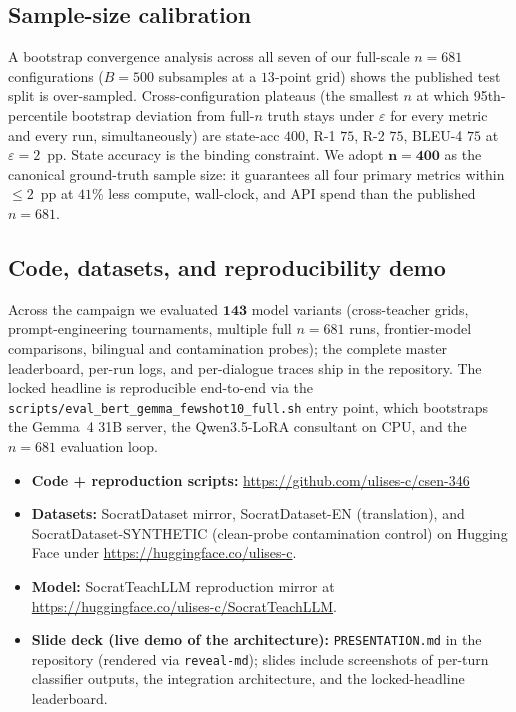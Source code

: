 \documentclass[11pt]{article}
\begin{document}
\subsection{Sample-size calibration}

A bootstrap convergence analysis across all seven of our full-scale $n{=}681$ configurations ($B{=}500$ subsamples at a $13$-point grid) shows the published test split is over-sampled. Cross-configuration plateaus (the smallest $n$ at which 95th-percentile bootstrap deviation from full-$n$ truth stays under $\varepsilon$ for every metric and every run, simultaneously) are state-acc $400$, R-1 $75$, R-2 $75$, BLEU-4 $75$ at $\varepsilon=2$~pp. State accuracy is the binding constraint. We adopt $\boldsymbol{n{=}400}$ as the canonical ground-truth sample size: it guarantees all four primary metrics within $\leq 2$~pp at $41\%$ less compute, wall-clock, and API spend than the published $n{=}681$.

\subsection{Code, datasets, and reproducibility demo}
\label{sec:demo}

Across the campaign we evaluated $\mathbf{143}$ model variants (cross-teacher grids, prompt-engineering tournaments, multiple full $n{=}681$ runs, frontier-model comparisons, bilingual and contamination probes); the complete master leaderboard, per-run logs, and per-dialogue traces ship in the repository. The locked headline is reproducible end-to-end via the \texttt{scripts/\allowbreak eval\_\allowbreak bert\_\allowbreak gemma\_\allowbreak fewshot10\_\allowbreak full.sh} entry point, which bootstraps the Gemma~4 31B server, the Qwen3.5-LoRA consultant on CPU, and the $n{=}681$ evaluation loop.

\begin{itemize}\itemsep0pt
  \item \textbf{Code + reproduction scripts:} \url{https://github.com/ulises-c/csen-346}
  \item \textbf{Datasets:} SocratDataset \citep{peng2025kele} mirror, SocratDataset-EN (translation), and SocratDataset-SYNTHETIC (clean-probe contamination control) on Hugging Face under \url{https://huggingface.co/ulises-c}.
  \item \textbf{Model:} SocratTeachLLM reproduction mirror at \url{https://huggingface.co/ulises-c/SocratTeachLLM}.
  \item \textbf{Slide deck (live demo of the architecture):} \texttt{PRESENTATION.md} in the repository (rendered via \texttt{reveal-md}); slides include screenshots of per-turn classifier outputs, the integration architecture, and the locked-headline leaderboard.
\end{itemize}
\end{document}
